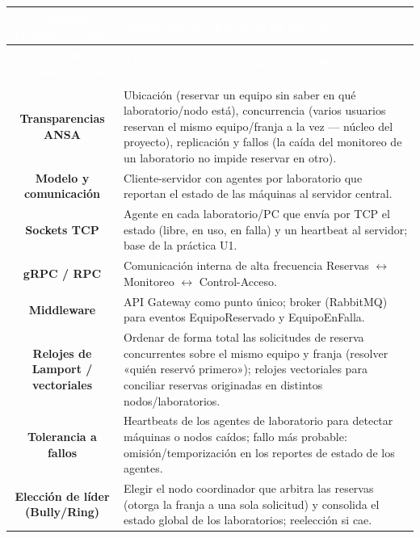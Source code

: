\documentclass[11pt]{article}
\begin{document}
\begin{longtable}{C A}
\textcolor{white}{\textbf{Concepto (Unidad $\cdot$ Tema)}} & \textcolor{white}{\textbf{Alternativa de aplicación en este PFC}}\\
\endfirsthead
{}\textcolor{white}{\textbf{Concepto (Unidad $\cdot$ Tema)}} & \textcolor{white}{\textbf{Alternativa de aplicación en este PFC}}\\
\endhead
{}\\
\textbf{Transparencias ANSA} & Ubicación (reservar un equipo sin saber en qué laboratorio/nodo está), concurrencia (varios usuarios reservan el mismo equipo/franja a la vez --- núcleo del proyecto), replicación y fallos (la caída del monitoreo de un laboratorio no impide reservar en otro).\\
\textbf{Modelo y comunicación} & Cliente-servidor con agentes por laboratorio que reportan el estado de las máquinas al servidor central.\\
\textbf{Sockets TCP} & Agente en cada laboratorio/PC que envía por TCP el estado (libre, en uso, en falla) y un heartbeat al servidor; base de la práctica U1.\\
\textbf{gRPC / RPC} & Comunicación interna de alta frecuencia Reservas $\leftrightarrow$ Monitoreo $\leftrightarrow$ Control-Acceso.\\
\textbf{Middleware} & API Gateway como punto único; broker (RabbitMQ) para eventos EquipoReservado y EquipoEnFalla.\\
\textbf{Relojes de Lamport / vectoriales} & Ordenar de forma total las solicitudes de reserva concurrentes sobre el mismo equipo y franja (resolver «quién reservó primero»); relojes vectoriales para conciliar reservas originadas en distintos nodos/laboratorios.\\
\textbf{Tolerancia a fallos} & Heartbeats de los agentes de laboratorio para detectar máquinas o nodos caídos; fallo más probable: omisión/temporización en los reportes de estado de los agentes.\\
\textbf{Elección de líder (Bully/Ring)} & Elegir el nodo coordinador que arbitra las reservas (otorga la franja a una sola solicitud) y consolida el estado global de los laboratorios; reelección si cae.\\

\end{longtable}
\end{document}
